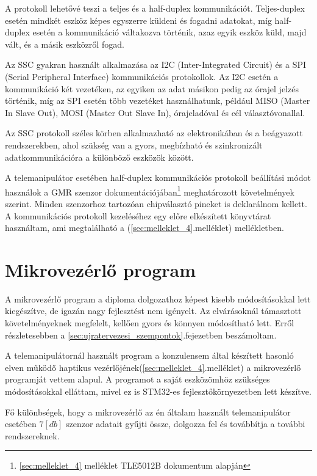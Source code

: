 A protokoll lehetővé teszi a teljes és a half-duplex kommunikációt. Teljes-duplex esetén mindkét eszköz képes egyszerre küldeni és fogadni adatokat, míg half-duplex esetén a kommunikáció váltakozva történik, azaz egyik eszköz küld, majd vált, és a másik eszközről fogad.

Az SSC gyakran használt alkalmazása az I2C (Inter-Integrated Circuit) és a SPI (Serial Peripheral Interface) kommunikációs protokollok. Az I2C esetén a kommunikáció két vezetéken, az egyiken az adat másikon pedig az órajel jelzés  történik, míg az SPI esetén több vezetéket használhatunk, például MISO (Master In Slave Out), MOSI (Master Out Slave In), órajeladóval és cél választóvonallal.

Az SSC protokoll széles körben alkalmazható az elektronikában és a beágyazott rendszerekben, ahol szükség van a gyors, megbízható és szinkronizált adatkommunikációra a különböző eszközök között.

A telemanipulátor esetében half-duplex kommunikációs protokoll beállítási módot használok a GMR szenzor dokumentációjában\footnote{\ref{sec:melleklet_4} melléklet TLE5012B dokumentum alapján} meghatározott követelmények szerint. Minden szenzorhoz tartozóan chipválasztó pineket is deklarálnom kellett. A kommunikációs protokoll kezeléséhez egy előre elkészített könyvtárat használtam, ami megtalálható a (\ref{sec:melleklet_4}.melléklet) mellékletben.\citep{ekekwe2008wide}

\section{Mikrovezérlő program}
\label{sec:MCU_program}

A mikrovezérlő program a diploma dolgozathoz képest kisebb módosításokkal lett kiegészítve, de igazán nagy fejlesztést nem igényelt. Az elvárásoknál támasztott követelményeknek megfelelt, kellően gyors és könnyen módosítható lett. Erről részletesebben a \ref{sec:ujratervezesi_szempontok}.fejezetben beszámoltam.

A telemanipulátornál használt program a konzulensem által készített hasonló elven működő haptikus vezérlőjének(\ref{sec:melleklet_4}.melléklet) a mikrovezérlő programját vettem alapul. A programot a saját eszközömhöz szükséges módosításokkal elláttam, mivel ez is STM32-es fejlesztőkörnyezetben lett készítve.

Fő különbségek, hogy a mikrovezérlő az én általam használt telemanipulátor esetében $7[db]$ szenzor adatait gyűjti össze, dolgozza fel és továbbítja a további rendszereknek.

